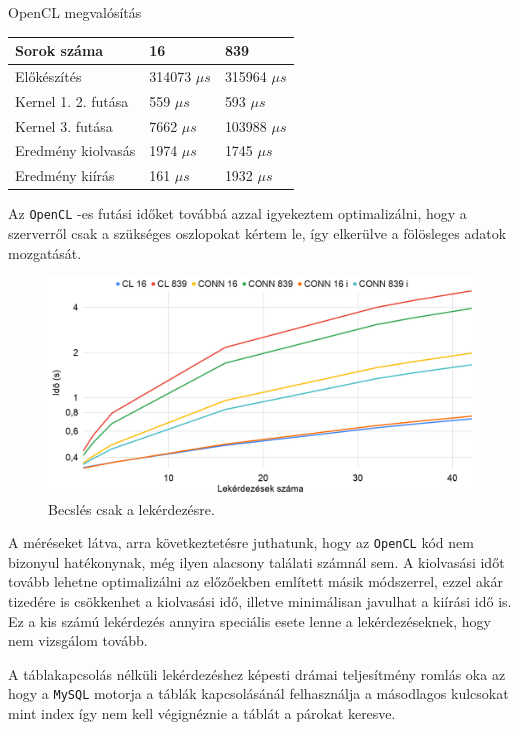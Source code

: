 OpenCL megvalósítás

\begin{table}[h!]
\centering
\begin{tabular}{|p{6cm}|p{3cm}|p{3cm}|}
\hline
Sorok száma & 16 & 839 \\
\hline
\hline
Előkészítés & 314073 $\mu s$ & 315964 $\mu s$ \\
\hline
Kernel 1. 2. futása & 559 $\mu s$ & 593 $\mu s$ \\
\hline
Kernel 3. futása & 7662 $\mu s$ & 103988 $\mu s$ \\
\hline
Eredmény kiolvasás & 1974 $\mu s$ & 1745 $\mu s$ \\
\hline
Eredmény kiírás & 161 $\mu s$ & 1932 $\mu s$ \\
\hline
\end{tabular}
\end{table}	

Az \texttt{OpenCL} -es futási időket továbbá azzal igyekeztem optimalizálni, hogy a szerverről csak a szükséges oszlopokat kértem le, így elkerülve a fölösleges adatok mozgatását.

\newpage
\begin{figure}[h!]
\centering
\includegraphics[width=\textwidth]{images/test/join.png}
\caption{Becslés csak a lekérdezésre.}
\label{fig:schema}
\end{figure}

A méréseket látva, arra következtetésre juthatunk, hogy az \texttt{OpenCL} kód nem bizonyul hatékonynak, még ilyen alacsony találati számnál sem. A kiolvasási időt tovább lehetne optimalizálni az előzőekben említett másik módszerrel, ezzel akár tizedére is csökkenhet a kiolvasási idő, illetve minimálisan javulhat a kiírási idő is. Ez a kis számú lekérdezés annyira speciális esete lenne a lekérdezéseknek, hogy nem vizsgálom tovább.

A táblakapcsolás nélküli lekérdezéshez képesti drámai teljesítmény romlás oka az hogy a \texttt{MySQL} motorja a táblák kapcsolásánál felhasználja a másodlagos kulcsokat mint index így nem kell végignéznie a táblát a párokat keresve.

